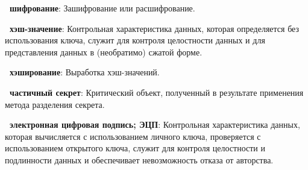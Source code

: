 {\bf \thedefctr~шифрование}:
Зашифрование или расшифрование.

{\bf \thedefctr~хэш-значение}:
Контрольная характеристика данных, которая определяется без использования ключа,
служит для контроля целостности данных и для представления данных в (необратимо)
сжатой форме.

{\bf \thedefctr~хэширование}:
Выработка хэш-значений.

{\bf \thedefctr~частичный секрет}:
Критический объект, 
полученный в результате применения метода разделения секрета.

{\bf \thedefctr~электронная цифровая подпись; ЭЦП}:
Контрольная характеристика данных, которая вычисляется с использованием личного
ключа, проверяется с использованием открытого ключа, служит для контроля
целостности и подлинности данных и обеспечивает невозможность отказа от
авторства.

